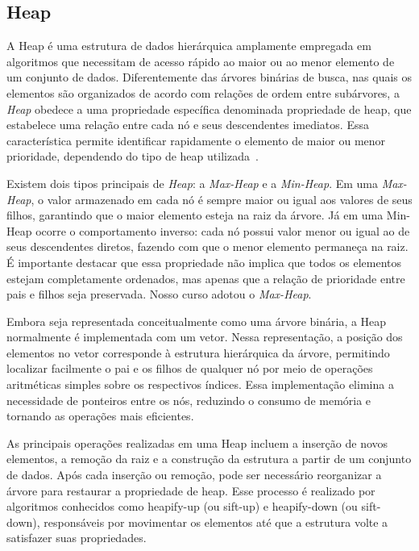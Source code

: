 \subsection{Heap}

A Heap é uma estrutura de dados hierárquica amplamente empregada em algoritmos que necessitam de acesso rápido ao maior ou ao menor elemento de um conjunto de dados. Diferentemente das árvores binárias de busca, nas quais os elementos são organizados de acordo com relações de ordem entre subárvores, a \textit{Heap} obedece a uma propriedade específica denominada propriedade de heap, que estabelece uma relação entre cada nó e seus descendentes imediatos. Essa característica permite identificar rapidamente o elemento de maior ou menor prioridade, dependendo do tipo de heap utilizada~\cite{cormen2022introduction}.

Existem dois tipos principais de \textit{Heap}: a \textit{Max-Heap} e a \textit{Min-Heap}. Em uma \textit{Max-Heap}, o valor armazenado em cada nó é sempre maior ou igual aos valores de seus filhos, garantindo que o maior elemento esteja na raiz da árvore. Já em uma Min-Heap ocorre o comportamento inverso: cada nó possui valor menor ou igual ao de seus descendentes diretos, fazendo com que o menor elemento permaneça na raiz. É importante destacar que essa propriedade não implica que todos os elementos estejam completamente ordenados, mas apenas que a relação de prioridade entre pais e filhos seja preservada. Nosso curso adotou o \textit{Max-Heap}.

Embora seja representada conceitualmente como uma árvore binária, a Heap normalmente é implementada com um vetor. Nessa representação, a posição dos elementos no vetor corresponde à estrutura hierárquica da árvore, permitindo localizar facilmente o pai e os filhos de qualquer nó por meio de operações aritméticas simples sobre os respectivos índices. Essa implementação elimina a necessidade de ponteiros entre os nós, reduzindo o consumo de memória e tornando as operações mais eficientes.

As principais operações realizadas em uma Heap incluem a inserção de novos elementos, a remoção da raiz e a construção da estrutura a partir de um conjunto de dados. Após cada inserção ou remoção, pode ser necessário reorganizar a árvore para restaurar a propriedade de heap. Esse processo é realizado por algoritmos conhecidos como heapify-up (ou sift-up) e heapify-down (ou sift-down), responsáveis por movimentar os elementos até que a estrutura volte a satisfazer suas propriedades.

